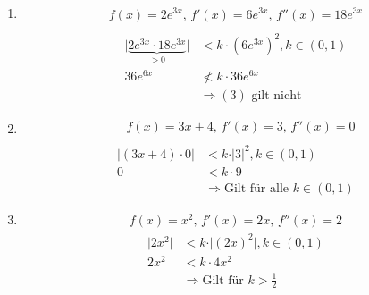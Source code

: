 \documentclass[fleqn,12pt]{scrartcl}
\let\oldsqrt\sqrt
\def\sqrt{\mathpalette\DHLhksqrt}
\def\DHLhksqrt#1#2{%
	\setbox0=\hbox{$#1\oldsqrt{#2\,}$}\dimen0=\ht0
	\advance\dimen0-0.2\ht0
	\setbox2=\hbox{\vrule height\ht0 depth -\dimen0}%
{\box0\lower0.4pt\box2}}
\begin{document}
\begin{enumerate}
\begin{enumerate}[label=\roman*)]
\begin{align*}
					&\Rightarrow \frac{{\vert e^x - e^{-x} \vert}}{{e^x + e^{-x}}} < 1\\
							\exists k \in (0,1): 
							&\Rightarrow \frac{{\vert e^x - e^{-x} \vert}}{{e^x + e^{-x}}} < \sqrt{k}\\
						\end{align*}
					\item
						\begin{align*}
							f(x) = 2e^{3x}, \, f'(x) = 6e^{3x},\, f''(x) = 18e^{3x}
						\end{align*}
						\begin{align*}
						\end{align*}
							\begin{align*}
								\vert \underbrace{2e^{3x} \cdot 18 e^{3x}}_{>0} \vert &< k\cdot (6e^{3x})^2, k \in (0,1)\\
								36 e^{6x} &\not< k \cdot 36e^{6x}\\
								&\Rightarrow (3) \text{ gilt nicht}
							\end{align*}
						\item
							\begin{align*}
								&f(x) = 3x + 4, \, f'(x) = 3,\, f''(x) = 0\\
							\end{align*}
							\begin{align*}
								\vert (3x + 4)\cdot 0 \vert &< k \cdot \vert 3 \vert^2, k \in (0,1)\\
								0 &< k\cdot 9\\
									 &\Rightarrow \text{Gilt für alle } k\in (0,1)
							\end{align*}
							\item
								\begin{align*}
									f(x) = x^2, \, f'(x) = 2x, \, f''(x) = 2
								\end{align*}
								\begin{align*}
									\vert 2x^2 \vert &< k \cdot \vert (2x)^2 \vert, k \in (0,1)\\
									2x^2 &< k \cdot 4x^2\\
									&\Rightarrow \text{Gilt für } k > \frac12
								\end{align*}
				\end{enumerate}
\end{enumerate}
\end{document}
